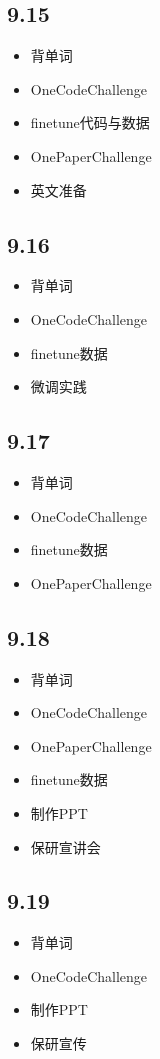 \documentclass[UTF8]{ctexart}
\begin{document}
\subsection*{9.15}
\begin{itemize}
    \item 背单词
    \item OneCodeChallenge
    \item finetune代码与数据
    \item OnePaperChallenge
    \item 英文准备
\end{itemize}

\subsection*{9.16}
\begin{itemize}
    \item 背单词
    \item OneCodeChallenge
    \item finetune数据
    \item 微调实践
\end{itemize}

\subsection*{9.17}
\begin{itemize}
    \item 背单词
    \item OneCodeChallenge
    \item finetune数据
    \item OnePaperChallenge
\end{itemize}

\subsection*{9.18}
\begin{itemize}
    \item 背单词
    \item OneCodeChallenge
    \item OnePaperChallenge
    \item finetune数据
    \item 制作PPT
    \item 保研宣讲会
\end{itemize}

\subsection*{9.19}
\begin{itemize}
    \item 背单词
    \item OneCodeChallenge
    \item 制作PPT
    \item 保研宣传
\end{itemize}
\end{document}
